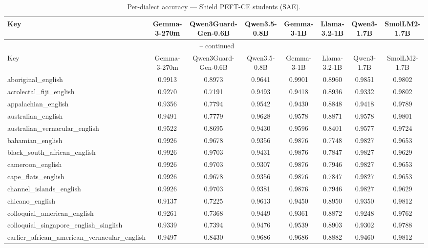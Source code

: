 \begin{landscape}
\begin{longtable}{lccccccc}
\caption{Per-dialect accuracy — Shield PEFT-CE students (SAE).} \\
\label{tab:students_peft_ce_per_dialect_sae}
\toprule
Key & Gemma-3-270m & Qwen3Guard-Gen-0.6B & Qwen3.5-0.8B & Gemma-3-1B & Llama-3.2-1B & Qwen3-1.7B & SmolLM2-1.7B \\
\midrule
\endfirsthead
\multicolumn{8}{c}{\tablename\ \thetable{} -- continued} \\
\toprule
Key & Gemma-3-270m & Qwen3Guard-Gen-0.6B & Qwen3.5-0.8B & Gemma-3-1B & Llama-3.2-1B & Qwen3-1.7B & SmolLM2-1.7B \\
\midrule
\endhead
aboriginal\_english & 0.9913 & 0.8973 & 0.9641 & 0.9901 & 0.8960 & 0.9851 & 0.9802 \\
acrolectal\_fiji\_english & 0.9270 & 0.7191 & 0.9493 & 0.9418 & 0.8936 & 0.9332 & 0.9802 \\
appalachian\_english & 0.9356 & 0.7794 & 0.9542 & 0.9430 & 0.8848 & 0.9418 & 0.9789 \\
australian\_english & 0.9491 & 0.7779 & 0.9628 & 0.9578 & 0.8871 & 0.9578 & 0.9801 \\
australian\_vernacular\_english & 0.9522 & 0.8695 & 0.9430 & 0.9596 & 0.8401 & 0.9577 & 0.9724 \\
bahamian\_english & 0.9926 & 0.9678 & 0.9356 & 0.9876 & 0.7748 & 0.9827 & 0.9653 \\
black\_south\_african\_english & 0.9926 & 0.9703 & 0.9431 & 0.9876 & 0.7847 & 0.9827 & 0.9629 \\
cameroon\_english & 0.9926 & 0.9703 & 0.9307 & 0.9876 & 0.7946 & 0.9827 & 0.9653 \\
cape\_flats\_english & 0.9926 & 0.9678 & 0.9356 & 0.9876 & 0.7847 & 0.9827 & 0.9653 \\
channel\_islands\_english & 0.9926 & 0.9703 & 0.9381 & 0.9876 & 0.7946 & 0.9827 & 0.9629 \\
chicano\_english & 0.9137 & 0.7225 & 0.9613 & 0.9450 & 0.8950 & 0.9350 & 0.9812 \\
colloquial\_american\_english & 0.9261 & 0.7368 & 0.9449 & 0.9361 & 0.8872 & 0.9248 & 0.9762 \\
colloquial\_singapore\_english\_singlish & 0.9339 & 0.7394 & 0.9476 & 0.9539 & 0.8903 & 0.9302 & 0.9788 \\
earlier\_african\_american\_vernacular\_english & 0.9497 & 0.8430 & 0.9686 & 0.9686 & 0.8882 & 0.9460 & 0.9812 \\

\end{longtable}
\end{landscape}
